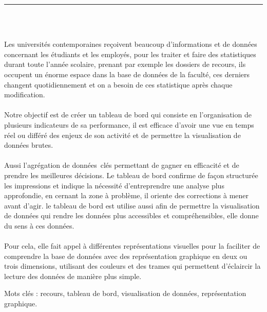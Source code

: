\documentclass[12pt]{report}
\newenvironment{changemargin}[2]{%
\begin{list}{}{%
\setlength{\topsep}{0pt}%
\setlength{\leftmargin}{#1}%
\setlength{\rightmargin}{#2}%
\setlength{\listparindent}{\parindent}%
\setlength{\itemindent}{\parindent}%
\setlength{\parsep}{\parskip}%
}%
\item[]}{\end{list}}
\begin{document}
\begin{center}
    {\color{Blue} \rule{3in}{1.4mm} }\\
    \vspace{0.1in}
    \scshape{\fontsize{34}{46}{\bfseries{\color{Blue}{Résumé}}}}
    \\
    \vspace{0.6in}
\end{center}
\begin{changemargin}{0.9cm}{0.9cm}
Les universités contemporaines reçoivent beaucoup d’informations et de données concernant les étudiants et les employés, pour les traiter et faire des statistiques durant toute l’année scolaire, prenant par exemple les dossiers de recours, ils occupent un énorme espace dans la base de données de la faculté, ces derniers changent quotidiennement et on a besoin de ces statistique après chaque modification.
\\\\
Notre objectif est de créer un tableau de bord qui consiste en l'organisation de plusieurs indicateurs de sa performance, il est efficace d’avoir une vue en temps réel ou différé des enjeux de son activité et de permettre la visualisation de données brutes.
\\\\
Aussi l’agrégation de données clés permettant de gagner en efficacité et de prendre les meilleures décisions. Le tableau de bord confirme de façon structurée les impressions et  indique la nécessité d’entreprendre une analyse plus approfondie, en cernant la zone à problème, il oriente des corrections à mener avant d’agir. le tableau de bord est utilise aussi afin de permettre la visualisation de données qui rendre les données plus accessibles et compréhensibles, elle donne du sens à ces données.
\\\\
Pour cela, elle fait appel à différentes représentations visuelles pour la faciliter de comprendre la base de données avec des représentation graphique en deux ou trois dimensions, utilisant des couleurs et des trames qui permettent d'éclaircir la lecture des données de manière plus simple.
\end{changemargin}

\vspace{1in}

\begin{changemargin}{0.9cm}{0.9cm}
Mots clés : recours, tableau de bord, visualisation de données, représentation graphique.
\end{changemargin}
\end{document}
